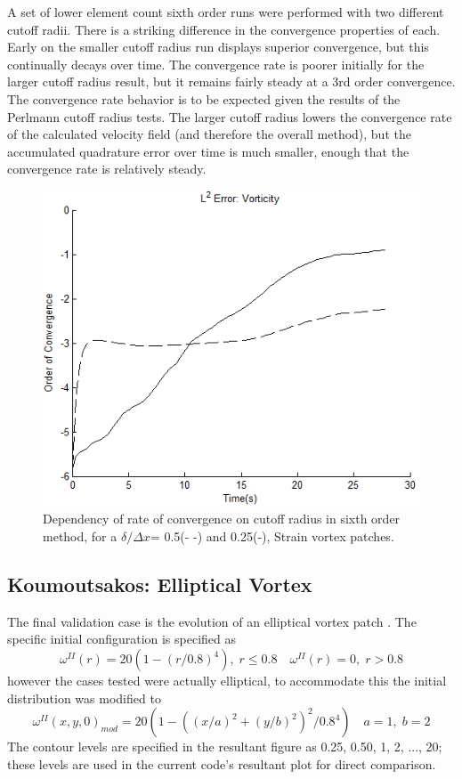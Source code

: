\documentclass[]{aiaa-tc}%
\newcommand{\be}{\begin{equation}}
\newcommand{\ben}[1]{\begin{equation}\label{#1}}
\newcommand{\ee}{\end{equation}}
\begin{document}
A set of lower element count sixth order runs were performed with two different cutoff radii. There is a striking difference in the convergence properties of each. Early on the smaller cutoff radius run displays superior convergence, but this continually decays over time. The convergence rate is poorer initially for the larger cutoff radius result, but it remains fairly steady at a 3rd order convergence. The convergence rate behavior is to be expected given the results of the Perlmann cutoff radius tests. The larger cutoff radius lowers the convergence rate of the calculated velocity field (and therefore the overall method), but the accumulated quadrature error over time is much smaller, enough that the convergence rate is relatively steady.

\begin{figure}
\centering
\includegraphics[width=.5\textwidth]{Strain6vs6R.PNG}
\caption{\label{fig:Strain6vs6}Dependency of rate of convergence on cutoff radius in sixth order method, for a $\delta/\Delta x$= 0.5(- -) and 0.25(-), Strain vortex patches. }
\end{figure}

\subsection{Koumoutsakos: Elliptical Vortex}
The final validation case is the evolution of an elliptical vortex patch \cite{Koum1997}. The specific initial configuration is specified as
\be \omega^{II}(r) = 20(1-(r/0.8)^4), \; r\leq 0.8 \quad \omega^{II}(r)=0, \; r>0.8 \ee
however the cases tested were actually elliptical, to accommodate this the initial distribution was modified to
\ben{KoumEqn} \omega^{II}(x,y,0)_{mod} = 20(1-((x/a)^2+(y/b)^2)^2/0.8^4 ) \quad a=1, \; b=2 \ee
The contour levels are specified in the resultant figure as 0.25, 0.50, 1, 2, ..., 20; these levels are used in the current code's resultant plot for direct comparison.
\end{document}
